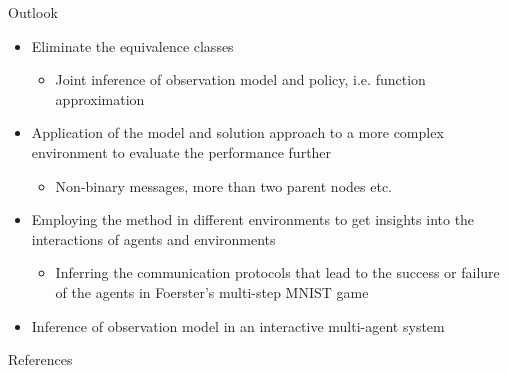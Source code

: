 \documentclass[
	english,%
	aspectratio=169,%
	color={accentcolor=3b},
	logo=true,%
	colorframetitle=false,%
	]{tudabeamer}
\begin{document}
\begin{frame}{Outlook}
\vspace{-5pt}
\begin{itemize}
	\item Eliminate the equivalence classes
	\begin{itemize}
		\item Joint inference of observation model and policy, i.e. function approximation
	\end{itemize}
	\item Application of the model and solution approach to a more complex
	environment to evaluate the performance further
	\begin{itemize}
		\item Non-binary messages, more than two parent nodes etc.
	\end{itemize}
	\item Employing the method in different environments to get insights
	into the interactions of agents and environments
	\begin{itemize}
		\item Inferring the communication protocols that lead
		to the success or failure of the agents in Foerster's multi-step MNIST game \cite{Foerster2016}
	\end{itemize}
	\item Inference of observation model in an interactive multi-agent system
\end{itemize}
\centering
{}
\end{frame}


\begin{frame}{References}
\vspace{-10pt}
\small


\end{frame}
\end{document}
